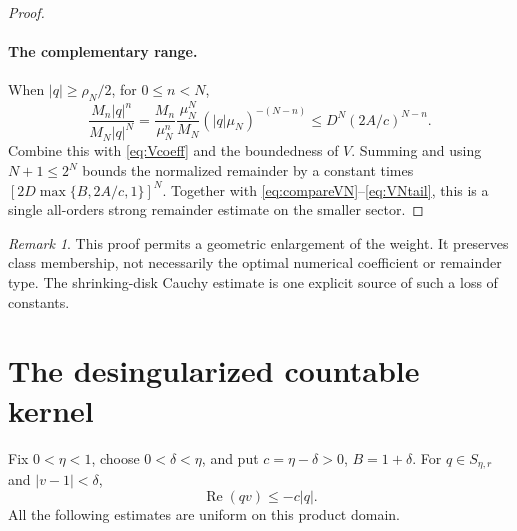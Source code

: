 \documentclass[11pt,a4paper]{article}
\numberwithin{equation}{section}
\theoremstyle{definition}\newtheorem{definition}[theorem]{Definition}
\theoremstyle{remark}\newtheorem{remark}[theorem]{Remark}
\DeclareMathOperator{\Rea}{Re}
\begin{document}
\begin{proof}
\paragraph{The complementary range.}
When $|q|\ge\rho_N/2$, for $0\le n<N$,
\begin{equation}
 \frac{M_n|q|^n}{M_N|q|^N}
 =\frac{M_n}{\mu_N^n}\frac{\mu_N^N}{M_N}
      (|q|\mu_N)^{-(N-n)}
 \le D^N(2A/c)^{N-n}.
 \label{eq:largerange}
\end{equation}
Combine this with \eqref{eq:Vcoeff} and the boundedness of $V$.
Summing and using $N+1\le2^N$ bounds the normalized remainder by a
constant times $[2D\max\{B,2A/c,1\}]^N$. Together with
\eqref{eq:compareVN}--\eqref{eq:VNtail}, this is a single all-orders
strong remainder estimate on the smaller sector.
\end{proof}

\begin{remark}
This proof permits a geometric enlargement of the weight. It preserves
class membership, not necessarily the optimal numerical coefficient or
remainder type. The shrinking-disk Cauchy estimate is one explicit source
of such a loss of constants.
\end{remark}

\section{The desingularized countable kernel}
\label{sec:kernel}
Fix $0<\eta<1$, choose $0<\delta<\eta$, and put
$c=\eta-\delta>0$, $B=1+\delta$. For $q\in S_{\eta,r}$ and
$|v-1|<\delta$,
\begin{equation}
 \Rea(qv)\le-c|q|.
 \label{eq:negativeproduct}
\end{equation}
All the following estimates are uniform on this product domain.
\end{document}
